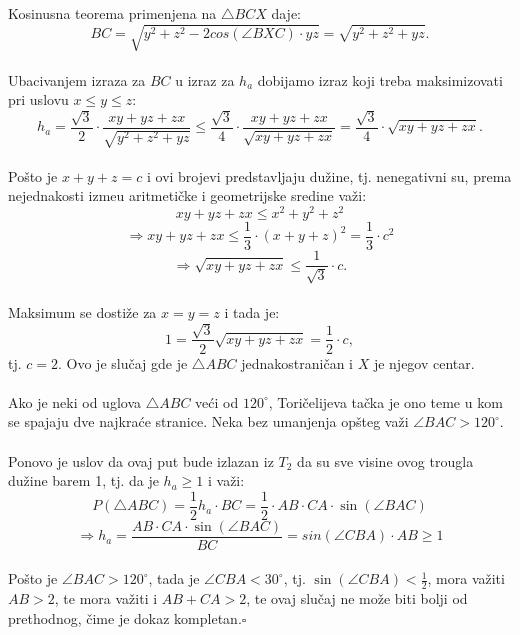 \documentclass[11pt,letter]{article}
\newcommand{\qed}{\hfill $\square$ \bigskip}
\begin{document}
\indent Kosinusna teorema primenjena na $\bigtriangleup BCX$ daje:
\\
$$BC=\sqrt{y^2+z^2-2cos(\angle BXC)\cdot yz}=\sqrt{y^2+z^2+yz}.$$
\\
\indent Ubacivanjem izraza za $BC$ u izraz za $h_a$ dobijamo izraz koji treba maksimizovati  pri uslovu $x\leqslant y\leqslant z$:
$$h_a=\frac{\sqrt3}{2}\cdot \frac{xy+yz+zx}{\sqrt{y^2+z^2+yz}}\leqslant \frac{\sqrt3}{4}\cdot \frac{xy+yz+zx}{\sqrt{xy+yz+zx}}=\frac{\sqrt3}{4}\cdot \sqrt{xy+yz+zx}.$$
\\
\indent Po\v sto je $x+y+z=c$ i ovi brojevi predstavljaju du\v zine, tj. nenegativni su, prema nejednakosti izme\dj u aritmeti\v cke i geometrijske sredine va\v zi:
$$xy+yz+zx\leqslant x^2+y^2+z^2$$
$$\Longrightarrow xy+yz+zx\leqslant \frac{1}{3}\cdot (x+y+z)^2=\frac{1}{3}\cdot c^2$$
$$\Longrightarrow \sqrt{xy+yz+zx}\leqslant \frac{1}{\sqrt3}\cdot c.$$
\\
\indent Maksimum se dosti\v ze za $x=y=z$ i tada je:
$$1=\frac{\sqrt3}{2}\sqrt{xy+yz+zx}=\frac{1}{2}\cdot c,$$
tj. $c=2$. Ovo je slu\v caj gde je $\bigtriangleup ABC$ jednakostrani\v can i $X$ je njegov centar.
\\
\\
\indent Ako je neki od uglova $\bigtriangleup ABC$ ve\' ci od $120^\circ$, Tori\v celijeva ta\v cka je ono teme u kom se spajaju dve najkra\' ce stranice. Neka bez umanjenja op\v steg va\v zi $\angle BAC>120^\circ$.
\\
\\
\indent Ponovo je uslov da ovaj put bude izlazan iz $T_2$ da su sve visine ovog trougla du\v zine barem 1, tj. da je $h_a\geqslant 1$ i va\v zi:
$$P(\bigtriangleup ABC)=\frac{1}{2} h_a \cdot BC=\frac{1}{2} \cdot AB\cdot CA \cdot \sin(\angle BAC)$$
$$\Longrightarrow h_a=\frac{ AB\cdot CA \cdot \sin(\angle BAC)}{BC}=sin(\angle CBA)\cdot AB\geqslant 1$$
\\
\indent Po\v sto je $\angle BAC>120^\circ$, tada je $\angle CBA<30^\circ$, tj. $\sin(\angle CBA)<\frac{1}{2}$, mora va\v ziti $AB>2$, te mora va\v ziti i $AB+CA>2$, te ovaj slu\v caj ne mo\v ze biti bolji od prethodnog, \v cime je dokaz kompletan.\qed
\\
\end{document}
